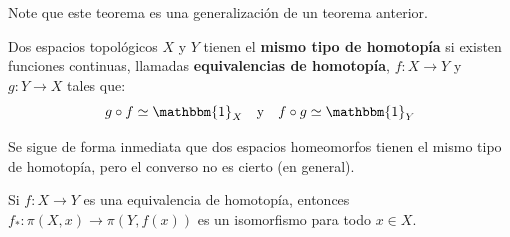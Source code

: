 \documentclass{article}
\theoremstyle{largebreak}
\newcommand\cf[3]{\ensuremath{#1:#2\rightarrow#3}}
\newcommand{\bbm}[1]{\mathbbm{#1}}
\begin{document}
    Note que este teorema es una generalización de un teorema anterior. 

    \begin{mydef}
        Dos espacios topológicos $X$ y $Y$ tienen el \textbf{mismo tipo de homotopía} si existen funciones continuas, llamadas \textbf{equivalencias de homotopía}, $\cf{f}{X}{Y}$ y $\cf{g}{Y}{X}$ tales que:
        \begin{equation*}
            g\circ f\simeq\bbm{1}_X\quad\textup{y}\quad f\circ g\simeq\bbm{1}_Y
        \end{equation*}
    \end{mydef}

    Se sigue de forma inmediata que dos espacios homeomorfos tienen el mismo tipo de homotopía, pero el converso no es cierto (en general).

    \begin{theor}
        Si $\cf{f}{X}{Y}$ es una equivalencia de homotopía, entonces $\cf{f_*}{\pi(X,x)}{\pi(Y,f(x))}$ es un isomorfismo para todo $x\in X$.
    \end{theor}
\end{document}
